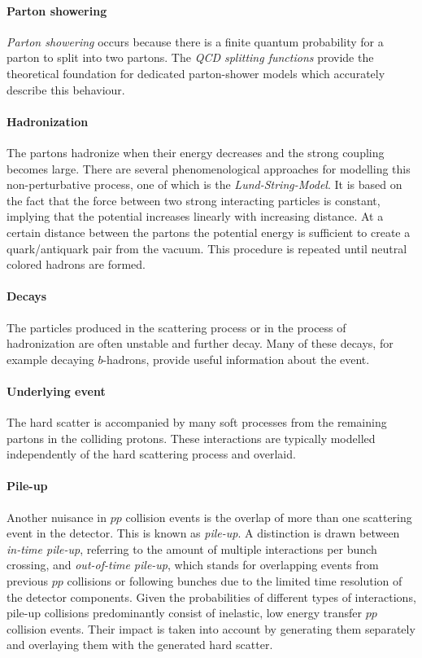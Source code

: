 \paragraph{Parton showering}
\emph{Parton showering} occurs because there is a finite quantum probability for a parton to split into two partons. The \emph{QCD splitting functions} \cite{Altarelli:1977zs} provide the theoretical foundation for dedicated parton-shower models which accurately describe this behaviour.
\paragraph{Hadronization}
The partons hadronize when their energy decreases and the strong coupling becomes large. There are several phenomenological approaches for modelling this non-perturbative process, one of which is the \emph{Lund-String-Model}. 
It is based on the fact that the force between two strong interacting particles is constant, implying that the potential increases linearly with increasing distance.
At a certain distance between the partons the potential energy is sufficient to create a quark/antiquark pair from the vacuum. This procedure is repeated until neutral colored hadrons are formed.
\paragraph{Decays}
The particles produced in the scattering process or in the process of hadronization are often unstable and further decay. Many of these decays, for example decaying $b$-hadrons, provide useful information about the event. %
\paragraph{Underlying event}
The hard scatter is accompanied by many soft processes from the remaining partons in the colliding protons. 
These interactions are typically modelled independently of the hard scattering process and overlaid.
\paragraph{Pile-up}
Another nuisance in $pp$ collision events is the overlap of more than one scattering event in the detector. This is known as \emph{pile-up}. A distinction is drawn between \emph{in-time pile-up}, referring to the amount of multiple interactions per bunch crossing, and \emph{out-of-time pile-up}, which stands for overlapping events from previous $pp$ collisions or following bunches due to the limited time resolution of the detector components.
Given the probabilities of different types of interactions, pile-up collisions predominantly consist of inelastic, low energy transfer $pp$ collision events. 
Their impact is taken into account by generating them separately and overlaying them with the generated hard scatter.
